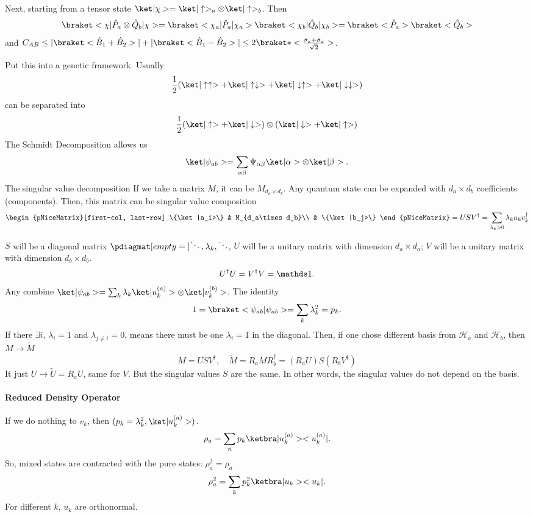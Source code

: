 Next, starting from a tensor state
$\ket|\chi> = \ket|\uparrow>_a \otimes \ket|\uparrow>_b$. Then
\[
  \braket<\chi|\hat P_a\otimes \hat Q_b|\chi>
= \braket<\chi_a|\hat P_a|\chi_a> \braket<\chi_b|\hat Q_b|\chi_b>
= \braket<\hat P_a> \braket<\hat Q_b>
\]
and $C_{AB} \leq |\braket<\hat B_1 + \hat B_2>| + |\braket<\hat B_1 - \hat B_2>|
  \leq 2\braket*<\frac{\hat \sigma_x + \hat \sigma_z}{\sqrt2}>$.

Put this into a genetic framework. Usually
\[
  \frac12(\ket|\uparrow\uparrow> + \ket|\uparrow\downarrow>
  + \ket|\downarrow\uparrow> + \ket|\downarrow\downarrow>)
\]
can be separated into
\[
  \frac12(\ket|\uparrow> + \ket|\downarrow>) \otimes
         (\ket|\downarrow> + \ket|\uparrow>)
\]
The Schmidt Decomposition allows us
\[
  \ket|\psi_{ab}> = \sum_{\alpha\beta} \Psi_{\alpha\beta}
    \ket|\alpha> \otimes \ket|\beta>.
\]
The singular value decomposition
If we take a matrix $M$, it can be $M_{d_a \times d_b}$.
Any quantum state can be expanded with $d_a \times d_b$
coefficients (components). Then, this matrix can be singular value composition
\[
  \begin{pNiceMatrix}[first-col, last-row]
    \{\ket|a_i>\} & M_{d_a\times d_b}\\
    & \{\ket|b_j>\}
  \end{pNiceMatrix} = USV^\dagger
= \sum_{\lambda_k>0} \lambda_k u_k v_k^\dagger
\]
$S$ will be a diagonal matrix $\pdiagmat[empty={}]{\ddots, \lambda_k, \ddots}$,
$U$ will be a unitary matrix with dimension $d_a \times d_a$;
$V$ will be a unitary matrix with dimension $d_b \times d_b$.
\[
  U^\dagger U = V^\dagger V = \identity.
\]
Any combine
$\ket|\psi_{ab}> = \sum_k \lambda_k \ket|u_k^{(a)}> \otimes \ket|v_k^{(b)}>$.
The identity
\[
  1 = \braket<\psi_{ab}|\psi_{ab}> = \sum_k \lambda_k^2 = p_k.
\]
If there $\exists i$, $\lambda_i = 1$ and $\lambda_{j\neq i} = 0$, means
there must be one $\lambda_i = 1$ in the diagonal. Then, if one chose different
basis from $\mathcal H_a$ and $\mathcal H_b$, then $M \to \tilde M$
\[
  M = USV^\dagger,\quad \tilde M = R_a M R_b^\dagger = (R_aU) S (R_bV^\dagger)
\]
It just $U \to \tilde U = R_aU$, same for $V$. But the singular values $S$ are
the same. In other words, the singular values do not depend on the basis.

\paragraph{Reduced Density Operator}

If we do nothing to $v_k$, then $(p_k = \lambda_k^2, \ket|u_k^{(a)}>)$.
\[
  \rho_a = \sum_n p_k \ketbra|u_k^{(a)}><u_k^{(a)}|.
\]
So, mixed states are contracted with the pure states: $\rho_a^2 = \rho_a$
\[
  \rho_a^2 = \sum_k p_k^2 \ketbra|u_k><u_k|.
\]
For different $k$, $u_k$ are orthonormal.

